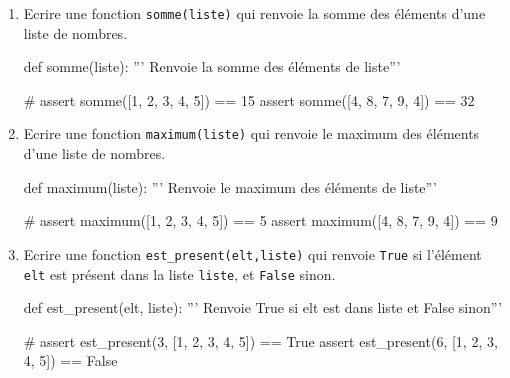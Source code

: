 \begin{exercice_cours}{}
	
	\begin{enumerate}
		\item Ecrire une fonction \texttt{somme(liste)} qui renvoie la somme des éléments d'une liste de nombres.
		
		\begin{CodePythontexAlt}[Largeur=1\linewidth,Centre,PremLigne=1, Lignes=false]{}
				def somme(liste):
					''' Renvoie la somme des éléments de liste'''







					#
				assert somme([1, 2, 3, 4, 5]) == 15
				assert somme([4, 8, 7, 9, 4]) == 32
				\end{CodePythontexAlt}

		\item Ecrire une fonction \texttt{maximum(liste)} qui renvoie le maximum des éléments d'une liste de nombres.
		\begin{CodePythontexAlt}[Largeur=1\linewidth,Centre,PremLigne=1, Lignes=false]{}
				def maximum(liste):
					''' Renvoie le maximum des éléments de liste'''









					#
				assert maximum([1, 2, 3, 4, 5]) == 5
				assert maximum([4, 8, 7, 9, 4]) == 9
				\end{CodePythontexAlt}
		\pagebreak

		\item Ecrire une fonction \texttt{est\_present(elt,liste)} qui renvoie \texttt{True} si l'élément \texttt{elt} est présent dans la liste \texttt{liste}, et \texttt{False} sinon.
		\begin{CodePythontexAlt}[Largeur=1\linewidth,Centre,PremLigne=1, Lignes=false]{}
				def est_present(elt, liste):
					''' Renvoie True si elt est dans liste et False sinon'''	









					#
				assert est_present(3, [1, 2, 3, 4, 5]) == True
				assert est_present(6, [1, 2, 3, 4, 5]) == False
				\end{CodePythontexAlt}
	
	\end{enumerate}
\end{exercice_cours}

